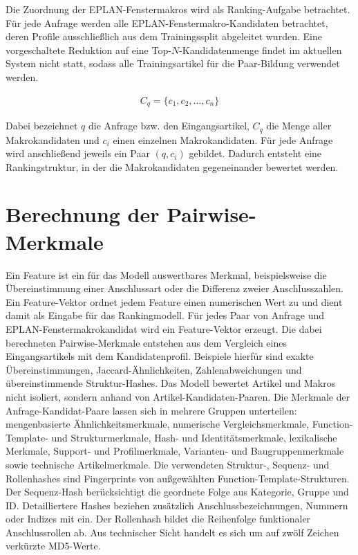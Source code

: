 Die Zuordnung der EPLAN-Fenstermakros \parencite{EPLAN-Makros} wird als Ranking-Aufgabe betrachtet. Für jede Anfrage werden alle EPLAN-Fenstermakro-Kandidaten \parencite{EPLAN-Makros} betrachtet, deren Profile ausschließlich aus dem Trainingssplit abgeleitet wurden. 
Eine vorgeschaltete Reduktion auf eine Top-$N$-Kandidatenmenge findet im aktuellen System nicht statt, sodass alle Trainingsartikel für die Paar-Bildung verwendet werden.

\begin{align}
    C_q = \{c_1,c_2,\dots,c_n\}
\end{align}

Dabei bezeichnet $q$ die Anfrage bzw. den Eingangsartikel, $C_q$ die Menge aller Makrokandidaten und $c_i$ einen einzelnen Makrokandidaten. Für jede Anfrage wird anschließend jeweils ein Paar $(q,c_i)$ gebildet. Dadurch entsteht eine Rankingstruktur, in der die Makrokandidaten gegeneinander bewertet werden.

\section{Berechnung der Pairwise-Merkmale}

Ein Feature ist ein für das Modell auswertbares Merkmal, beispielsweise die Übereinstimmung einer Anschlussart oder die Differenz zweier Anschlusszahlen. Ein Feature-Vektor ordnet jedem Feature einen numerischen Wert zu und dient damit als Eingabe für das Rankingmodell.
Für jedes Paar von Anfrage und EPLAN-Fenstermakrokandidat \parencite{EPLAN-Makros} wird ein Feature-Vektor erzeugt. Die dabei berechneten Pairwise-Merkmale entstehen aus dem Vergleich eines Eingangsartikels mit dem Kandidatenprofil. Beispiele hierfür sind exakte Übereinstimmungen, Jaccard-Ähnlichkeiten, Zahlenabweichungen und übereinstimmende Struktur-Hashes. Das Modell bewertet Artikel und Makros nicht isoliert, sondern anhand von Artikel-Kandidaten-Paaren.
Die Merkmale der Anfrage-Kandidat-Paare lassen sich in mehrere Gruppen unterteilen: mengenbasierte Ähnlichkeitsmerkmale, numerische Vergleichsmerkmale, Function-Template- und Strukturmerkmale, Hash- und Identitätsmerkmale, lexikalische Merkmale, Support- und Profilmerkmale, Varianten- und Baugruppenmerkmale sowie technische Artikelmerkmale. Die verwendeten Struktur-, Sequenz- und Rollenhashes sind Fingerprints von außgewählten Function-Template-Strukturen. Der Sequenz-Hash berücksichtigt die geordnete Folge aus Kategorie, Gruppe und ID. Detailliertere Hashes beziehen zusätzlich Anschlussbezeichnungen, Nummern oder Indizes mit ein. Der Rollenhash bildet die Reihenfolge funktionaler Anschlussrollen ab. Aus technischer Sicht handelt es sich um auf zwölf Zeichen verkürzte MD5-Werte.

